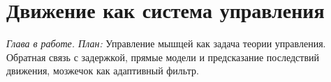 \chapter{Движение как система управления}
\label{sec:motor}

\emph{Глава в работе. План:} Управление мышцей как задача теории управления. Обратная связь с задержкой, прямые модели и предсказание последствий движения, мозжечок как адаптивный фильтр.
